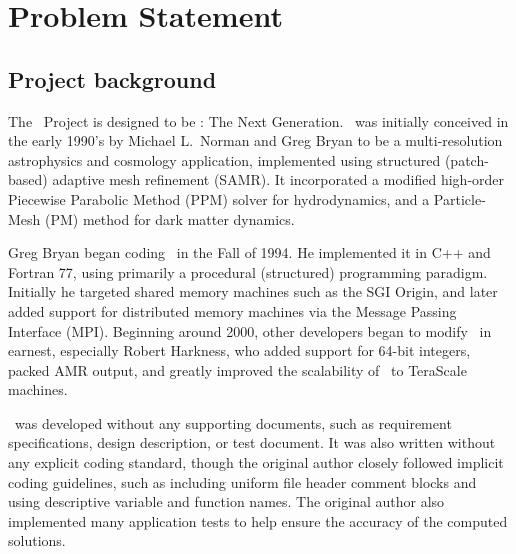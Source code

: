 \documentclass{article}
\begin{document}

\section{Problem Statement}

\subsection{Project background}


    The \cello\ Project is designed to be \enzo: The Next Generation.
    \enzo\ was initially conceived in the early 1990's by Michael
    L.~Norman and Greg Bryan to be a multi-resolution astrophysics and
    cosmology application, implemented using structured (patch-based)
    adaptive mesh refinement (SAMR).  It incorporated a modified
    high-order Piecewise Parabolic Method (PPM) solver for
    hydrodynamics, and a Particle-Mesh (PM) method for dark matter
    dynamics.

    Greg Bryan began coding \enzo\ in the Fall of 1994.  He
    implemented it in C++ and Fortran 77, using primarily a procedural
    (structured) programming paradigm.  Initially he targeted shared
    memory machines such as the SGI Origin, and later added support
    for distributed memory machines via the Message Passing Interface
    (MPI).  Beginning around 2000, other developers began to modify
    \enzo\ in earnest, especially Robert Harkness, who added support
    for 64-bit integers, packed AMR output, and greatly improved
    the scalability of \enzo\ to TeraScale machines.

    \enzo\ was developed without any supporting documents, such as
    requirement specifications, design description, or test document.
    It was also written without any explicit coding standard, though
    the original author closely followed implicit coding guidelines,
    such as including uniform file header comment blocks and using
    descriptive variable and function names.  The original author also
    implemented many application tests to help ensure the accuracy
    of the computed solutions.
\end{document}
